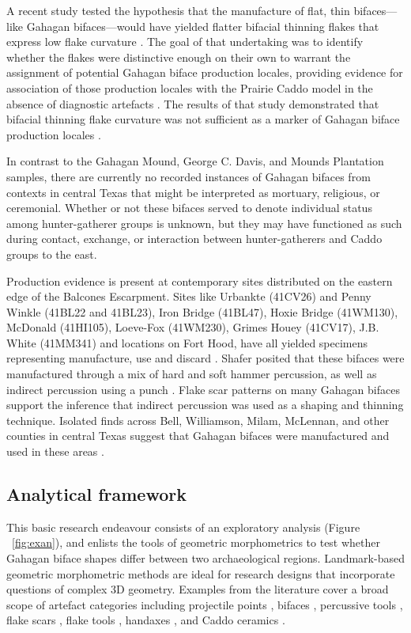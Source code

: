 \documentclass[review]{elsarticle}
\begin{document}
A recent study tested the hypothesis that the manufacture of flat, thin bifaces—like Gahagan bifaces—would have yielded flatter bifacial thinning flakes that express low flake curvature \citep{RN11568}. The goal of that undertaking was to identify whether the flakes were distinctive enough on their own to warrant the assignment of potential Gahagan biface production locales, providing evidence for association of those production locales with the Prairie Caddo model \citep{RN4924} in the absence of diagnostic artefacts \citep{RN11568}. The results of that study demonstrated that bifacial thinning flake curvature was not sufficient as a marker of Gahagan biface production locales \citep{RN11568}.

In contrast to the Gahagan Mound, George C. Davis, and Mounds Plantation samples, there are currently no recorded instances of Gahagan bifaces from contexts in central Texas that might be interpreted as mortuary, religious, or ceremonial. Whether or not these bifaces served to denote individual status among hunter-gatherer groups is unknown, but they may have functioned as such during contact, exchange, or interaction between hunter-gatherers and Caddo groups to the east.

Production evidence is present at contemporary sites distributed on the eastern edge of the Balcones Escarpment. Sites like Urbankte (41CV26) and Penny Winkle (41BL22 and 41BL23), Iron Bridge (41BL47), Hoxie Bridge (41WM130), McDonald (41HI105), Loeve-Fox (41WM230), Grimes Houey (41CV17), J.B. White (41MM341) and locations on Fort Hood, have all yielded specimens representing manufacture, use and discard \citep{RN20717,RN11565,RN2708,RN20718,RN4924,RN20719}. Shafer posited that these bifaces were manufactured through a mix of hard and soft hammer percussion, as well as indirect percussion using a punch \citep{RN4924,RN3684}. Flake scar patterns on many Gahagan bifaces support the inference that indirect percussion was used as a shaping and thinning technique. Isolated finds across Bell, Williamson, Milam, McLennan, and other counties in central Texas suggest that Gahagan bifaces were manufactured and used in these areas \citep{RN4924}.

\subsection*{Analytical framework}

This basic research endeavour \citep{RN20851} consists of an exploratory analysis (Figure ~\ref{fig:exan}), and enlists the tools of geometric morphometrics to test whether Gahagan biface shapes differ between two archaeological regions. Landmark-based geometric morphometric methods are ideal for research designs that incorporate questions of complex 3D geometry. Examples from the literature cover a broad scope of artefact categories including projectile points \citep{RN1750,RN1755}, bifaces \citep{RN1727,RN4392,RN11550,RN11783}, percussive tools \citep{RN1772}, flake scars \citep{RN253}, flake tools \citep{RN11552}, handaxes \citep{RN1730,RN1766,RN3145,RN1733,RN335}, and Caddo ceramics \citep{RN1994,RN11521,RN11782,RN11801,RN11716,RN20852}. 
\end{document}
